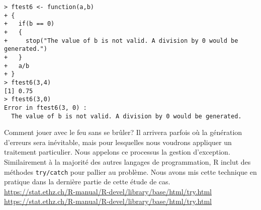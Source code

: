 \begin{lstlisting}[caption = Gestion des erreurs sous R,label=src:errorManagement]
> ftest6 <- function(a,b)
+ {
+   if(b == 0)
+   {
+     stop("The value of b is not valid. A division by 0 would be generated.")
+   }
+   a/b
+ }
> ftest6(3,4)
[1] 0.75
> ftest6(3,0)
Error in ftest6(3, 0) : 
  The value of b is not valid. A division by 0 would be generated.
\end{lstlisting}

\begin{moreInfo}{Comment jouer avec le feu sans se brûler?}
	Il arrivera parfois où la génération d'erreurs sera inévitable, mais pour lesquelles nous voudrons appliquer un traitement particulier. Nous appelons ce processus la gestion d'exception. Similairement à la majorité des autres langages de programmation, R inclut des méthodes \texttt{try/catch} pour pallier au problème. Nous avons mis cette technique en pratique dans la dernière partie de cette étude de cas. \\
	\url{https://stat.ethz.ch/R-manual/R-devel/library/base/html/try.html} \\
	\url{https://stat.ethz.ch/R-manual/R-devel/library/base/html/try.html}
\end{moreInfo}